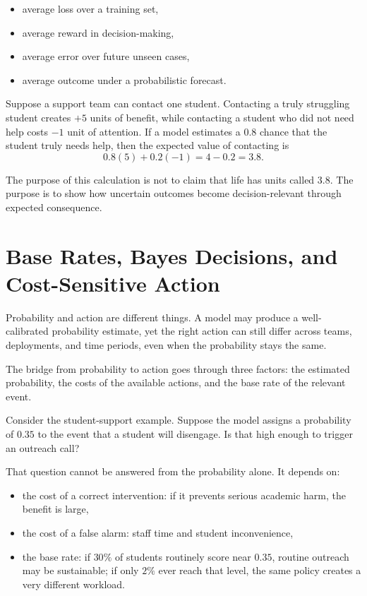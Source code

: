 \begin{itemize}[leftmargin=*]
\item average loss over a training set,
\item average reward in decision-making,
\item average error over future unseen cases,
\item average outcome under a probabilistic forecast.
\end{itemize}

Suppose a support team can contact one student. Contacting a truly struggling student creates \(+5\) units of benefit, while contacting a student who did not need help costs \(-1\) unit of attention. If a model estimates a \(0.8\) chance that the student truly needs help, then the expected value of contacting is
\[
0.8(5) + 0.2(-1) = 4 - 0.2 = 3.8.
\]

The purpose of this calculation is not to claim that life has units called \(3.8\). The purpose is to show how uncertain outcomes become decision-relevant through expected consequence.

\section*{Base Rates, Bayes Decisions, and Cost-Sensitive Action}

Probability and action are different things. A model may produce a well-calibrated probability estimate, yet the right action can still differ across teams, deployments, and time periods, even when the probability stays the same.

The bridge from probability to action goes through three factors: the estimated probability, the costs of the available actions, and the base rate of the relevant event.

Consider the student-support example. Suppose the model assigns a probability of $0.35$ to the event that a student will disengage. Is that high enough to trigger an outreach call?

That question cannot be answered from the probability alone. It depends on:
\begin{itemize}[leftmargin=*]
\item the cost of a correct intervention: if it prevents serious academic harm, the benefit is large,
\item the cost of a false alarm: staff time and student inconvenience,
\item the base rate: if $30\%$ of students routinely score near $0.35$, routine outreach may be sustainable; if only $2\%$ ever reach that level, the same policy creates a very different workload.
\end{itemize}

